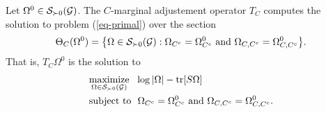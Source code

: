 \begin{lemma} \label{lem-tc-sol-opt}
    Let $\Omega^0 \in {\mathcal{S}}_{\succ 0}({\mathcal{G}})$. The $C$-marginal adjustement operator $T_C$ computes the solution to problem (\ref{eq-primal}) over the section 
    \begin{equation*}
        \Theta_C(\Omega^0) = {\left\{ \Omega \in {\mathcal{S}}_{\succ 0}({\mathcal{G}}) : \Omega_{C^c} = \Omega^0_{C^c} {\textrm{ and }} \Omega_{C, C^c} = \Omega^0_{C, C^c} \right\}}.
    \end{equation*}
    That is, $T_C \Omega^0$ is the solution to
    \begin{align} \label{eq-sub-optim}
        \begin{split}
            &\underset{\Omega \in \S_{\succ 0}(\G)}{\t{maximize}}\ \  \log |\Omega| - \tr[S\Omega]\\
            &\t{subject to}\ \ \Omega_{C^c} = \Omega^0_{C^c} \t{ and } \Omega_{C, C^c} = \Omega^0_{C, C^c}.
        \end{split}
    \end{align}
\end{lemma}

